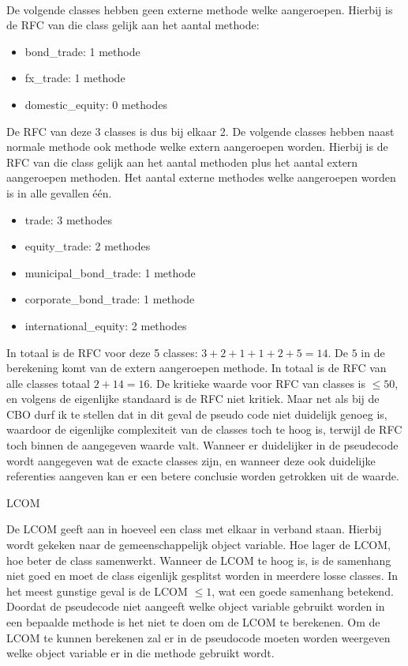 \documentclass[a4paper,titlepage]{artikel1}
\begin{document}
   \\
   De volgende classes hebben geen externe methode welke aangeroepen. Hierbij is de RFC van die class gelijk aan het aantal methode:
   \begin{itemize}
     \item bond\_trade: 1 methode
     \item fx\_trade: 1 methode
     \item domestic\_equity: 0 methodes
   \end{itemize}
   De RFC van deze 3 classes is dus bij elkaar 2.
   De volgende classes hebben naast normale methode ook methode welke extern aangeroepen worden. Hierbij is de RFC van die class gelijk aan het aantal methoden plus het aantal extern aangeroepen methoden. Het aantal externe methodes welke aangeroepen worden is in alle gevallen \'{e}\'{e}n.
   \begin{itemize}
     \item trade: 3 methodes
     \item equity\_trade: 2 methodes
     \item municipal\_bond\_trade: 1 methode
     \item corporate\_bond\_trade: 1 methode
     \item international\_equity: 2 methodes
   \end{itemize}
   In totaal is de RFC voor deze 5 classes: $3 + 2 + 1 + 1 + 2 + 5 = 14$. De $5$ in de berekening komt van de extern aangeroepen methode.
   In totaal is de RFC van alle classes totaal $2 + 14 = 16$. De kritieke waarde voor RFC van classes is $\leq50$, en volgens de eigenlijke standaard is de RFC niet kritiek. Maar net als bij de CBO durf ik te stellen dat in dit geval de pseudo code niet duidelijk genoeg is, waardoor de eigenlijke complexiteit van de classes toch te hoog is, terwijl de RFC toch binnen de aangegeven waarde valt. Wanneer er duidelijker in de pseudecode wordt aangegeven wat de exacte classes zijn, en wanneer deze ook duidelijke referenties aangeven kan er een betere conclusie worden getrokken uit de waarde.
   \begin{center}\begin{bf}LCOM\end{bf}\end{center}
   De LCOM geeft aan in hoeveel een class met elkaar in verband staan. Hierbij wordt gekeken naar de gemeenschappelijk object variable. Hoe lager de LCOM, hoe beter de class samenwerkt. Wanneer de LCOM te hoog is, is de samenhang niet goed en moet de class eigenlijk gesplitst worden in meerdere losse classes. In het meest gunstige geval is de LCOM $\leq1$, wat een goede samenhang betekend.\\Doordat de pseudecode niet aangeeft welke object variable gebruikt worden in een bepaalde methode is het niet te doen om de LCOM te berekenen. Om de LCOM te kunnen berekenen zal er in de pseudocode moeten worden weergeven welke object variable er in die methode gebruikt wordt.
\end{document}
